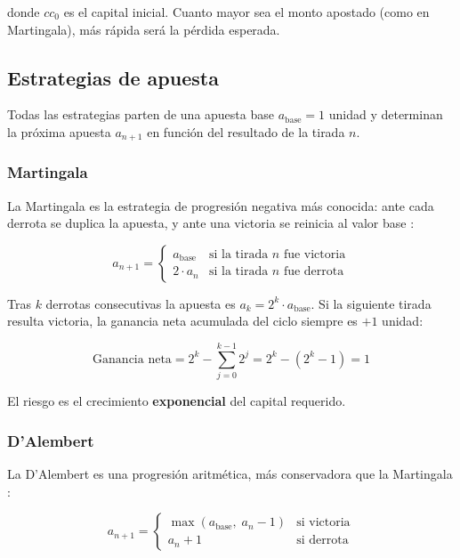 \documentclass[a4paper, 11pt]{article}
\begin{document}
donde $cc_0$ es el capital inicial. Cuanto mayor sea el monto apostado (como
en Martingala), más rápida será la pérdida esperada.

\subsection{Estrategias de apuesta}

Todas las estrategias parten de una apuesta base $a_{\text{base}} = 1$ unidad
y determinan la próxima apuesta $a_{n+1}$ en función del resultado de la
tirada $n$.

\subsubsection{Martingala}
\label{sec:martingala}

La Martingala es la estrategia de progresión negativa más conocida: ante
cada derrota se duplica la apuesta, y ante una victoria se reinicia al
valor base \cite{wikipedia_martingala}:

\begin{equation}
  a_{n+1} =
  \begin{cases}
    a_{\text{base}} & \text{si la tirada } n \text{ fue victoria} \\
    2 \cdot a_n      & \text{si la tirada } n \text{ fue derrota}
  \end{cases}
  \label{eq:martingala}
\end{equation}

Tras $k$ derrotas consecutivas la apuesta es $a_k = 2^k \cdot a_{\text{base}}$.
Si la siguiente tirada resulta victoria, la ganancia neta acumulada del ciclo
siempre es $+1$ unidad:

\begin{equation}
  \text{Ganancia neta} = 2^k - \sum_{j=0}^{k-1} 2^j = 2^k - (2^k - 1) = 1
  \label{eq:martingala_ganancia}
\end{equation}

El riesgo es el crecimiento \textbf{exponencial} del capital requerido.

\subsubsection{D'Alembert}
\label{sec:dalembert}

La D'Alembert es una progresión aritmética, más conservadora que la
Martingala \cite{wikipedia_dalembert}:

\begin{equation}
  a_{n+1} =
  \begin{cases}
    \max(a_{\text{base}},\; a_n - 1) & \text{si victoria} \\
    a_n + 1                           & \text{si derrota}
  \end{cases}
  \label{eq:dalembert}
\end{equation}
\end{document}
